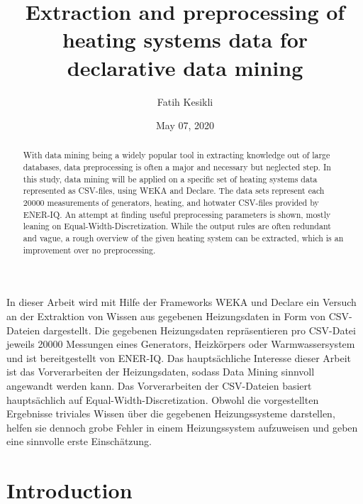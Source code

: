 \documentclass[bachelor,english]{info1thesis}
\title{Extraction and preprocessing of heating systems data for declarative data mining}
\author{Fatih Kesikli}
\date{May 07, 2020}
\begin{document}








\begin{abstract}
    With data mining being a widely popular tool in extracting knowledge out of large databases, data preprocessing is often a major and necessary but neglected step. In this study, data mining will be applied on a specific set of heating systems data represented as CSV-files, using WEKA and Declare. The data sets represent each 20000 measurements of generators, heating, and hotwater CSV-files provided by ENER-IQ. An attempt at finding useful preprocessing parameters is shown, mostly leaning on Equal-Width-Discretization. While the output rules are often redundant and vague, a rough overview of the given heating system can be extracted, which is an improvement over no preprocessing.	
\end{abstract}
\begin{germanabstract}
	In dieser Arbeit wird mit Hilfe der Frameworks WEKA und Declare ein Versuch an der Extraktion von Wissen aus gegebenen Heizungsdaten in Form von CSV-Dateien dargestellt. Die gegebenen Heizungsdaten repräsentieren pro CSV-Datei jeweils 20000 Messungen eines Generators, Heizkörpers oder Warmwassersystem und ist bereitgestellt von ENER-IQ. Das hauptsächliche Interesse dieser Arbeit ist das Vorverarbeiten der Heizungsdaten, sodass Data Mining sinnvoll angewandt werden kann. Das Vorverarbeiten der CSV-Dateien basiert hauptsächlich auf Equal-Width-Discretization. Obwohl die vorgestellten Ergebnisse triviales Wissen über die gegebenen Heizungssysteme darstellen, helfen sie dennoch grobe Fehler in einem Heizungssystem aufzuweisen und geben eine sinnvolle erste Einschätzung.
\end{germanabstract}

\thesistableofcontents





\chapter{Introduction}
\label{sec:introduction}
\end{document}
